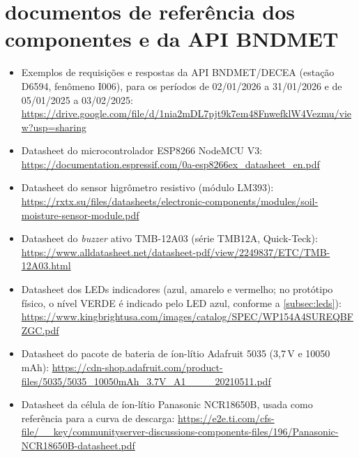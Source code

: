 \anexos


\chapter{documentos de referência dos componentes e da API BNDMET}
\label{anexo:geral}

\begin{itemize}

    \item \label{anexo:bndmet} Exemplos de requisições e respostas da
    API BNDMET/DECEA (estação D6594, fenômeno I006), para os períodos
    de 02/01/2026 a 31/01/2026 e de 05/01/2025 a 03/02/2025:
    \url{https://drive.google.com/file/d/1nia2mDL7pjt9k7em48FnwefklW4Vezmu/view?usp=sharing}

    \item \label{anexo:datasheet-esp8266} Datasheet do microcontrolador
    ESP8266 NodeMCU V3:
    \url{https://documentation.espressif.com/0a-esp8266ex_datasheet_en.pdf}

    \item \label{anexo:datasheet-higrometro} Datasheet do sensor
    higrômetro resistivo (módulo LM393):
    \url{https://rxtx.su/files/datasheets/electronic-components/modules/soil-moisture-sensor-module.pdf}

    \item \label{anexo:datasheet-buzzer} Datasheet do \textit{buzzer}
    ativo TMB-12A03 (série TMB12A, Quick-Teck):
    \url{https://www.alldatasheet.net/datasheet-pdf/view/2249837/ETC/TMB-12A03.html}

    \item \label{anexo:datasheet-leds} Datasheet dos LEDs indicadores
    (azul, amarelo e vermelho; no protótipo físico, o nível VERDE é
    indicado pelo LED azul, conforme a \autoref{subsec:leds}):
    \url{https://www.kingbrightusa.com/images/catalog/SPEC/WP154A4SUREQBFZGC.pdf}

    \item \label{anexo:datasheet-bateria} Datasheet do pacote de bateria
    de íon-lítio Adafruit 5035 (3,7\,V e 10050\,mAh):
    \url{https://cdn-shop.adafruit.com/product-files/5035/5035_10050mAh_3.7V_A1____20210511.pdf}

    \item \label{anexo:datasheet-celula} Datasheet da célula de
    íon-lítio Panasonic NCR18650B, usada como referência para a curva de
    descarga:
    \url{https://e2e.ti.com/cfs-file/__key/communityserver-discussions-components-files/196/Panasonic-NCR18650B-datasheet.pdf}


\end{itemize}
